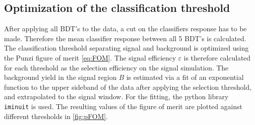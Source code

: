 \subsection{Optimization of the classification threshold}
After applying all BDT's to the data, a cut on the classifiers response has to be made. Therefore the mean classifier response between all 5 BDT's is calculated.
The classification threshold separating signal and background is optimized using the Punzi figure of merit \autoref{eq:FOM}.
The signal efficiency $\varepsilon$ is therefore calculated for each threshold as the selection efficiency on the signal simulation. The background yield in the signal region $B$
is estimated via a fit of an exponential function to the upper sideband of the data after applying the selection threshold, and extrapolated to the signal window.
For the fitting, the python library \texttt{iminuit} \cite{iminuit} is used.
The resulting values of the figure of merit are plotted against different thresholds in \autoref{fig:pFOM}.
